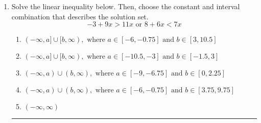\documentclass[14pt]{extbook}
\newcommand{\litem}[1]{\item#1\hspace*{-1cm}\rule{\textwidth}{0.4pt}}
\begin{document}
\begin{enumerate}
{\begin{enumerate}[label=\Alph*.]
\end{enumerate} }
\litem{
Solve the linear inequality below. Then, choose the constant and interval combination that describes the solution set.\[ -3 + 9 x > 11 x \text{ or } 8 + 6 x < 7 x \]\begin{enumerate}[label=\Alph*.]
\item \( (-\infty, a] \cup [b, \infty), \text{ where } a \in [-6, -0.75] \text{ and } b \in [3, 10.5] \)
\item \( (-\infty, a] \cup [b, \infty), \text{ where } a \in [-10.5, -3] \text{ and } b \in [-1.5, 3] \)
\item \( (-\infty, a) \cup (b, \infty), \text{ where } a \in [-9, -6.75] \text{ and } b \in [0, 2.25] \)
\item \( (-\infty, a) \cup (b, \infty), \text{ where } a \in [-6, -0.75] \text{ and } b \in [3.75, 9.75] \)
\item \( (-\infty, \infty) \)

\end{enumerate} }
\end{enumerate}
\end{document}
